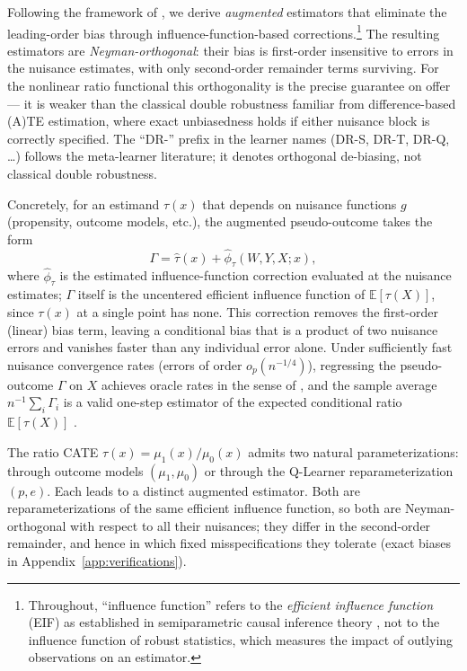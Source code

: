 \documentclass{article}
\newcommand{\E}{\mathbb{E}}
\begin{document}
Following the framework of \citet{kennedy2022semiparametric}, we derive
\emph{augmented} estimators that eliminate the leading-order bias through
influence-function-based corrections.\footnote{Throughout, ``influence
function'' refers to the \emph{efficient influence function} (EIF) as
established in semiparametric causal inference theory
\citep{robins1994estimation, kennedy2022semiparametric}, not to the
influence function of robust statistics, which measures the impact of
outlying observations on an estimator.} The resulting estimators are
\emph{Neyman-orthogonal}: their bias is first-order insensitive to
errors in the nuisance estimates, with only second-order remainder
terms surviving. For the nonlinear ratio functional this
orthogonality is the precise guarantee on offer --- it is weaker than
the classical double robustness familiar from difference-based (A)TE
estimation, where exact unbiasedness holds if either nuisance block is
correctly specified. The ``DR-'' prefix in the learner names (DR-S,
DR-T, DR-Q, \ldots) follows the meta-learner literature; it denotes
orthogonal de-biasing, not classical double robustness.

Concretely, for an estimand
$\tau(x)$ that depends on nuisance functions $g$ (propensity, outcome
models, etc.), the augmented pseudo-outcome takes the form
\begin{equation}
\Gamma = \hat{\tau}(x) + \hat{\phi}_{\tau}(W, Y, X; x),
\end{equation}
where $\hat{\phi}_{\tau}$ is the estimated influence-function correction
evaluated at the nuisance estimates; $\Gamma$ itself is the uncentered
efficient influence function of $\E[\tau(X)]$, since $\tau(x)$ at a
single point has none. This correction removes the
first-order (linear) bias term, leaving a conditional bias that is a
product of two nuisance errors and vanishes faster than any individual
error alone. Under sufficiently fast nuisance convergence rates
(errors of order $o_p(n^{-1/4})$), regressing the
pseudo-outcome $\Gamma$ on $X$ achieves oracle rates in the sense of
\citet{kennedy2023optimal}, and the sample average
$n^{-1}\sum_i \Gamma_i$ is a valid one-step estimator of the expected
conditional ratio $\E[\tau(X)]$
\citep{robins1994estimation, chernozhukov2018double}.
 
The ratio CATE $\tau(x) = \mu_1(x)/\mu_0(x)$ admits two natural
parameterizations: through outcome models $(\mu_1, \mu_0)$ or through
the Q-Learner reparameterization $(p, e)$. Each leads to a distinct
augmented estimator. Both are reparameterizations of the same efficient
influence function, so both are Neyman-orthogonal with respect to all
their nuisances; they differ in the second-order remainder, and hence in
which fixed misspecifications they tolerate (exact biases in
Appendix~\ref{app:verifications}).
\end{document}
